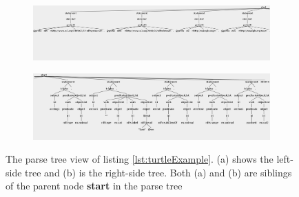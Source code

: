 \begin{figure}

	\begin{subfigure}[]{}
		\centering\includegraphics[width=1\linewidth]{images/parseTreeAllLeft.png}
	\end{subfigure}     
		\centering
	\begin{subfigure}[]{}
		\centering\includegraphics[width=1\linewidth]{images/parseTreeAlRight.png}
		\label{fig:rightSideParseTree}
	\end{subfigure}
	\caption{The parse tree view of listing \ref{lst:turtleExample}. (a) shows the left-side tree and (b) is the right-side tree. Both (a) and (b) are siblings of the parent node \textbf{start} in the parse tree  }
	\label{Fig:parseTreeTAll}
\end{figure}

